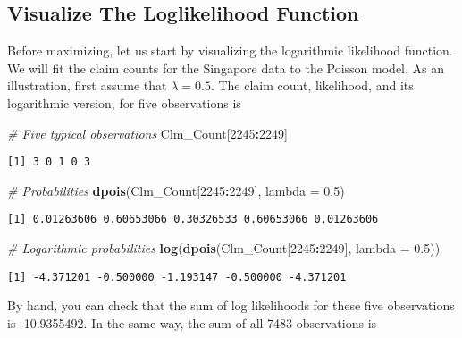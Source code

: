 \documentclass[]{book}
\newenvironment{Shaded}{\begin{snugshade}}{\end{snugshade}}
\newcommand{\KeywordTok}[1]{\textcolor[rgb]{0.13,0.29,0.53}{\textbf{#1}}}
\newcommand{\DataTypeTok}[1]{\textcolor[rgb]{0.13,0.29,0.53}{#1}}
\newcommand{\DecValTok}[1]{\textcolor[rgb]{0.00,0.00,0.81}{#1}}
\newcommand{\FloatTok}[1]{\textcolor[rgb]{0.00,0.00,0.81}{#1}}
\newcommand{\CommentTok}[1]{\textcolor[rgb]{0.56,0.35,0.01}{\textit{#1}}}
\newcommand{\OperatorTok}[1]{\textcolor[rgb]{0.81,0.36,0.00}{\textbf{#1}}}
\newcommand{\NormalTok}[1]{#1}
\theoremstyle{definition}
\theoremstyle{definition}
\theoremstyle{definition}
\theoremstyle{remark}
\begin{document}
\subsection{Visualize The Loglikelihood
Function}\label{visualize-the-loglikelihood-function}

Before maximizing, let us start by visualizing the logarithmic
likelihood function. We will fit the claim counts for the Singapore data
to the Poisson model. As an illustration, first assume that
\(\lambda = 0.5\). The claim count, likelihood, and its logarithmic
version, for five observations is

\begin{Shaded}
\begin{Highlighting}[]
\CommentTok{# Five typical observations}
\NormalTok{Clm_Count[}\DecValTok{2245}\OperatorTok{:}\DecValTok{2249}\NormalTok{]}
\end{Highlighting}
\end{Shaded}

\begin{verbatim}
[1] 3 0 1 0 3
\end{verbatim}

\begin{Shaded}
\begin{Highlighting}[]
\CommentTok{# Probabilities}
\KeywordTok{dpois}\NormalTok{(Clm_Count[}\DecValTok{2245}\OperatorTok{:}\DecValTok{2249}\NormalTok{], }\DataTypeTok{lambda =} \FloatTok{0.5}\NormalTok{)}
\end{Highlighting}
\end{Shaded}

\begin{verbatim}
[1] 0.01263606 0.60653066 0.30326533 0.60653066 0.01263606
\end{verbatim}

\begin{Shaded}
\begin{Highlighting}[]
\CommentTok{# Logarithmic probabilities}
\KeywordTok{log}\NormalTok{(}\KeywordTok{dpois}\NormalTok{(Clm_Count[}\DecValTok{2245}\OperatorTok{:}\DecValTok{2249}\NormalTok{], }\DataTypeTok{lambda =} \FloatTok{0.5}\NormalTok{))}
\end{Highlighting}
\end{Shaded}

\begin{verbatim}
[1] -4.371201 -0.500000 -1.193147 -0.500000 -4.371201
\end{verbatim}

By hand, you can check that the sum of log likelihoods for these five
observations is -10.9355492. In the same way, the sum of all 7483
observations is
\end{document}
